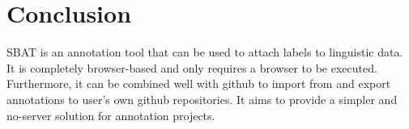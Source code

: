 \documentclass[12ptm a4paper]{article}
\begin{document}
\section{Conclusion}
SBAT is an annotation tool that can be used to attach labels to linguistic data. It is completely browser-based and only requires a browser to be executed. Furthermore, it can be combined well with github to import from and export annotations to user's own github repositories. It aims to provide a simpler and no-server solution for annotation projects.\\ 












\end{document}
